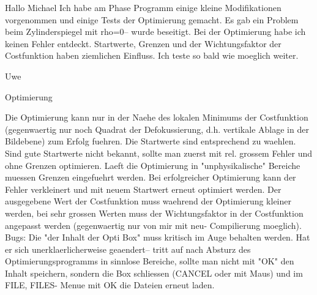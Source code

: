 
Hallo Michael
Ich habe am Phase Programm einige kleine Modifikationen vorgenommen und einige 
Tests der Optimierung gemacht. Es gab ein Problem beim Zylinderspiegel mit
rho=0-- wurde beseitigt. Bei der Optimierung habe ich keinen Fehler entdeckt.
Startwerte, Grenzen und der Wichtungsfaktor der Costfunktion haben ziemlichen
Einfluss. Ich teste so bald wie moeglich weiter. 

Uwe

Optimierung

Die Optimierung kann nur in der Naehe des lokalen Minimums der 
Costfunktion (gegenwaertig nur noch Quadrat der Defokussierung, d.h. vertikale
Ablage in der Bildebene) zum Erfolg fuehren. Die Startwerte sind entsprechend 
zu waehlen. Sind gute Startwerte nicht bekannt, sollte man zuerst mit rel.
grossem Fehler und ohne Grenzen optimieren. Laeft die Optimierung in
"unphysikalische" Bereiche muessen Grenzen eingefuehrt werden. Bei
erfolgreicher Optimierung kann der Fehler verkleinert und mit neuem Startwert
erneut optimiert werden. Der ausgegebene Wert der Costfunktion muss
waehrend der Optimierung kleiner werden, bei sehr grossen Werten muss der 
Wichtungsfaktor in der Costfunktion angepasst werden (gegenwaertig nur von mir
mit neu- Compilierung moeglich).
Bugs: Die "der Inhalt der Opti Box" muss kritisch im Auge behalten werden. Hat
er sich unerklaerlicherweise geaendert-- tritt auf nach Absturz des
Optimierungsprogramms in sinnlose Bereiche, sollte man nicht mit "OK" den
Inhalt speichern, sondern die Box schliessen (CANCEL oder mit Maus) und im
FILE, FILES- Menue mit OK die Dateien erneut laden.
